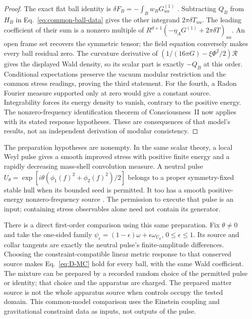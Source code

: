 \begin{proof}
The exact flat ball identity is
$\delta F_B=-\int_Bw_RG^{(1)}_{uu}$ \cite[Theorem on the exact
identity]{PaperCII}. Subtracting $Q_B$ from $H_B$ in
Eq.~\eqref{eq:common-ball-data} gives the other integrand
$2\pi\delta T_{uu}$. The leading coefficient of their sum is a nonzero
multiple of $R^{d+1}(-\eta_AG^{(1)}+2\pi\delta T)_{uu}$.
An open frame set recovers the symmetric tensor; the field equation
conversely makes every ball residual zero.
The curvature derivative of
$(1/(16\pi G)-\xi\Phi^2/2)\mathcal R$ gives the displayed Wald density,
so its scalar part is exactly $-Q_B$ at this order.
Conditional expectations preserve the vacuum modular restriction and
the common stress readings, proving the third statement.
For the fourth, a Radon Fourier measure supported only at zero would
give a constant source. Integrability forces its energy density to
vanish, contrary to the positive energy. The nonzero-frequency
identification theorem of Consciousness~II now applies with its stated
response hypotheses. These are consequences of that model's results,
not an independent derivation of modular consistency.
\end{proof}

The preparation hypotheses are nonempty. In the same scalar theory,
a local Weyl pulse gives a smooth improved stress with positive finite
energy and a rapidly decreasing mass-shell convolution measure.
A neutral pulse
$U_\theta=\exp[i\theta(\phi_1(f)^2+\phi_2(f)^2)/2]$
belongs to a proper symmetry-fixed stable hull when its bounded seed is
permitted. It too has a smooth positive-energy nonzero-frequency source
\cite[Sections on prepared sources and selected algebras]{PaperCII}.
The permission to execute that pulse is an input; containing stress
observables alone need not contain its generator.

There is a direct first-order comparison using this same preparation.
Fix $\theta\ne0$ and take the one-sided family
$\psi_\epsilon=(1-\epsilon)\omega+\epsilon\omega_{U_\theta}$,
$0\le\epsilon\le1$. Its source and collar tangents are exactly the
neutral pulse's finite-amplitude differences. Choosing the
constraint-compatible linear metric response to that conserved
source makes Eq.~\eqref{eq:D-MC} hold for every ball, with the same
Wald coefficient. The mixture can be prepared by a recorded random
choice of the permitted pulse or identity; that choice and the
apparatus are charged. The prepared matter source is not the whole
apparatus source when controls occupy the tested domain.
This common-model comparison uses the Einstein coupling and
gravitational constraint data as inputs, not outputs of the pulse.

